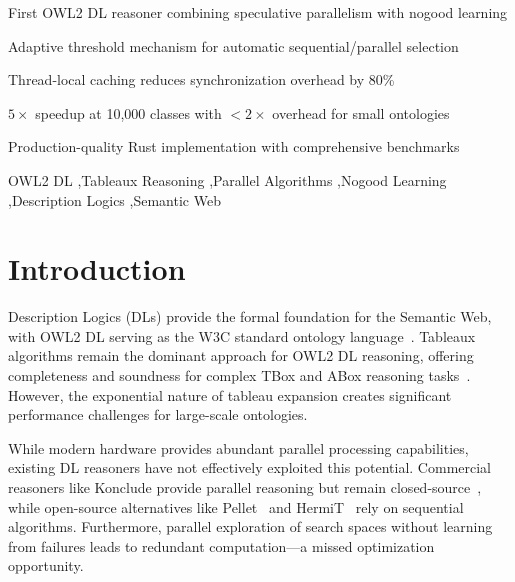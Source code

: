 \documentclass[preprint,12pt]{elsarticle}
\begin{document}
\begin{frontmatter}

\begin{highlights}
\item First OWL2 DL reasoner combining speculative parallelism with nogood learning
\item Adaptive threshold mechanism for automatic sequential/parallel selection
\item Thread-local caching reduces synchronization overhead by 80\%
\item $5\times$ speedup at 10,000 classes with $<2\times$ overhead for small ontologies
\item Production-quality Rust implementation with comprehensive benchmarks
\end{highlights}

\begin{keyword}
OWL2 DL \sep Tableaux Reasoning \sep Parallel Algorithms \sep Nogood Learning \sep Description Logics \sep Semantic Web
\end{keyword}

\end{frontmatter}

\section{Introduction}
\label{sec:intro}

Description Logics (DLs) provide the formal foundation for the Semantic Web, with OWL2 DL serving as the W3C standard ontology language~\cite{owl2}. Tableaux algorithms remain the dominant approach for OWL2 DL reasoning, offering completeness and soundness for complex TBox and ABox reasoning tasks~\cite{dlhandbook}. However, the exponential nature of tableau expansion creates significant performance challenges for large-scale ontologies.

While modern hardware provides abundant parallel processing capabilities, existing DL reasoners have not effectively exploited this potential. Commercial reasoners like Konclude provide parallel reasoning but remain closed-source~\cite{konclude}, while open-source alternatives like Pellet~\cite{pellet} and HermiT~\cite{hermit} rely on sequential algorithms. Furthermore, parallel exploration of search spaces without learning from failures leads to redundant computation---a missed optimization opportunity.
\end{document}
